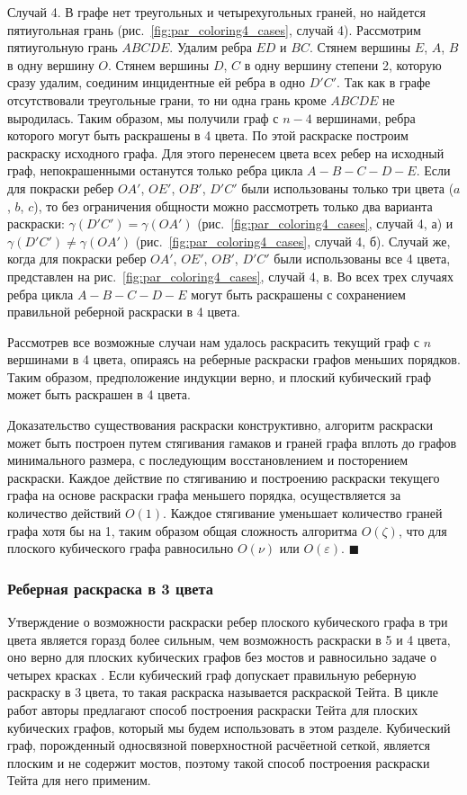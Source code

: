 Случай 4. В графе нет треугольных и четырехугольных граней, но найдется пятиугольная грань (рис.~\ref{fig:par_coloring4_cases}, случай 4).
Рассмотрим пятиугольную грань $ABCDE$.
Удалим ребра $ED$ и $BC$.
Стянем вершины $E$, $A$, $B$ в одну вершину $O$.
Стянем вершины $D$, $C$ в одну вершину степени 2, которую сразу удалим, соединим инцидентные ей ребра в одно $D'C'$.
Так как в графе отсутствовали треугольные грани, то ни одна грань кроме $ABCDE$ не выродилась.
Таким образом, мы получили граф с $n - 4$ вершинами, ребра которого могут быть раскрашены в 4 цвета.
По этой раскраске построим раскраску исходного графа.
Для этого перенесем цвета всех ребер на исходный граф, непокрашенными останутся только ребра цикла $A-B-C-D-E$.
Если для покраски ребер $OA'$, $OE'$, $OB'$, $D'C'$ были использованы только три цвета ($a$, $b$, $c$), то без ограничения общности можно рассмотреть только два варианта раскраски: $\gamma(D'C') = \gamma(OA')$ (рис.~\ref{fig:par_coloring4_cases}, случай 4, а) и $\gamma(D'C') \ne \gamma(OA')$ (рис.~\ref{fig:par_coloring4_cases}, случай 4, б). 
Случай же, когда для покраски ребер $OA'$, $OE'$, $OB'$, $D'C'$ были использованы все 4 цвета, представлен на рис.~\ref{fig:par_coloring4_cases}, случай 4, в.
Во всех трех случаях ребра цикла $A-B-C-D-E$ могут быть раскрашены с сохранением правильной реберной раскраски в 4 цвета.

Рассмотрев все возможные случаи нам удалось раскрасить текущий граф с $n$ вершинами в 4 цвета, опираясь на реберные раскраски графов меньших порядков.
Таким образом, предположение индукции верно, и плоский кубический граф может быть раскрашен в 4 цвета.

Доказательство существования раскраски конструктивно, алгоритм раскраски может быть построен путем стягивания гамаков и граней графа вплоть до графов минимального размера, с последующим восстановлением и посторением раскраски.
Каждое действие по стягиванию и построению раскраски текущего графа на основе раскраски графа меньшего порядка, осуществляется за количество действий $O(1)$.
Каждое стягивание уменьшает количество граней графа хотя бы на 1, таким образом общая сложность алгоритма $O(\zeta)$, что для плоского кубического графа равносильно $O(\nu)$ или $O(\varepsilon)$.
$\blacksquare$

\subsubsection{Реберная раскраска в 3 цвета}

Утверждение о возможности раскраски ребер плоского кубического графа в три цвета является горазд более сильным, чем возможность раскраски в 5 и 4 цвета, оно верно для плоских кубических графов без мостов и равносильно задаче о четырех красках \cite{Soifer2009,Tait1880}.
Если кубический граф допускает правильную реберную раскраску в 3 цвета, то такая раскраска называется раскраской Тейта.
В цикле работ \cite{Kurapov2018,Kurapov2020,Kurapov2020Mono} авторы предлагают способ построения раскраски Тейта для плоских кубических графов, который мы будем использовать в этом разделе.
Кубический граф, порожденный односвязной поверхностной расчёетной сеткой, является плоским и не содержит мостов, поэтому такой способ построения раскраски Тейта для него применим.

